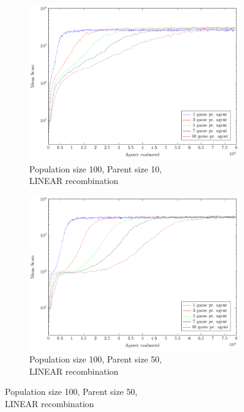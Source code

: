 \begin{figure}
\begin{subfigure}[b]{0.49\textwidth}
    \end{subfigure}
    \begin{subfigure}[b]{0.49\textwidth}
    	\centering
    	\caption{Population size 100, Parent size 10,\\LINEAR recombination}
        \includegraphics[width=\textwidth]{data/cma_population_offspring/100x_split/linear_l100_o10/mean/PlotFile.pdf}
    \end{subfigure}
    \begin{subfigure}[b]{0.49\textwidth}
    	\centering
    	\caption{Population size 100, Parent size 50,\\LINEAR recombination}
        \includegraphics[width=\textwidth]{data/cma_population_offspring/100x_split/linear_l100_o50/mean/PlotFile.pdf}

\end{subfigure}
\end{figure}
